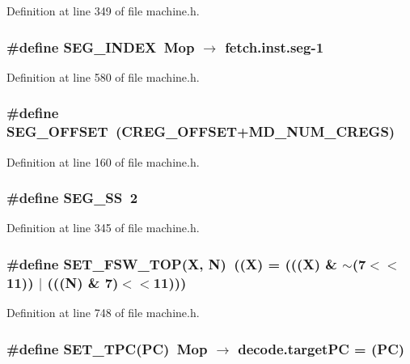Definition at line 349 of file machine.h.
\subsubsection[{SEG\_\-INDEX}]{\setlength{\rightskip}{0pt plus 5cm}\#define SEG\_\-INDEX~Mop $\rightarrow$ fetch.inst.seg-1}\label{machine_8h_743e046c574c96eb7fe6f5dd9135ee20}




Definition at line 580 of file machine.h.
\subsubsection[{SEG\_\-OFFSET}]{\setlength{\rightskip}{0pt plus 5cm}\#define SEG\_\-OFFSET~(CREG\_\-OFFSET+MD\_\-NUM\_\-CREGS)}\label{machine_8h_38bf72e3397905cc6144836a527007a2}




Definition at line 160 of file machine.h.
\subsubsection[{SEG\_\-SS}]{\setlength{\rightskip}{0pt plus 5cm}\#define SEG\_\-SS~2}\label{machine_8h_9256283086f94e7b6b5bca25508ef861}




Definition at line 345 of file machine.h.
\subsubsection[{SET\_\-FSW\_\-TOP}]{\setlength{\rightskip}{0pt plus 5cm}\#define SET\_\-FSW\_\-TOP(X, \/  N)~((X) = (((X) \& $\sim$(7$<$$<$11)) $|$ (((N) \& 7)$<$$<$11)))}\label{machine_8h_950344ff93d54d07782a34a172b7df3e}




Definition at line 748 of file machine.h.
\subsubsection[{SET\_\-TPC}]{\setlength{\rightskip}{0pt plus 5cm}\#define SET\_\-TPC(PC)~Mop $\rightarrow$ decode.targetPC = (PC)}\label{machine_8h_a011a999c5e6ef0a7aa0cba5164732d3}




